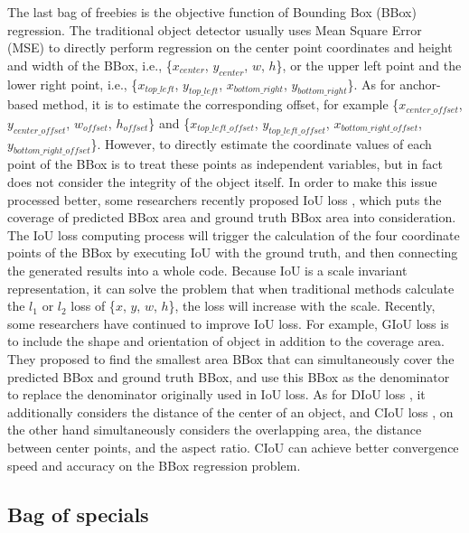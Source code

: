 \documentclass[10pt,twocolumn,letterpaper]{article}
\begin{document}
The last bag of freebies is the objective function of Bounding Box (BBox) regression. The traditional object detector usually uses Mean Square Error (MSE) to directly perform regression on the center point coordinates and height and width of the BBox, i.e., \{$x_{center}$, $y_{center}$, $w$, $h$\}, or the upper left point and the lower right point, i.e., \{$x_{top\_left}$, $y_{top\_left}$, $x_{bottom\_right}$, $y_{bottom\_right}$\}. As for anchor-based method, it is to estimate the corresponding offset, for example \{$x_{center\_offset}$, $y_{center\_offset}$, $w_{offset}$, $h_{offset}$\} and  \{$x_{top\_left\_offset}$, $y_{top\_left\_offset}$, $x_{bottom\_right\_offset}$, $y_{bottom\_right\_offset}$\}. However, to directly estimate the coordinate values of each point of the BBox is to treat these points as independent variables, but in fact does not consider the integrity of the object itself. In order to make this issue processed better, some researchers recently proposed IoU loss \cite{yu2016unitbox}, which puts the coverage of predicted BBox area and ground truth BBox area into consideration. The IoU loss computing process will trigger the calculation of the four coordinate points of the BBox by executing IoU with the ground truth, and then connecting the generated results into a whole code. Because IoU is a scale invariant representation, it can solve the problem that when traditional methods calculate the $l_1$ or $l_2$ loss of \{$x$, $y$, $w$, $h$\}, the loss will increase with the scale. Recently, some researchers have continued to improve IoU loss. For example, GIoU loss \cite{rezatofighi2019generalized} is to include the shape and orientation of object in addition to the coverage area. They proposed to find the smallest area BBox that can simultaneously cover the predicted BBox and ground truth BBox, and use this BBox as the denominator to replace the denominator originally used in IoU loss. As for DIoU loss \cite{zheng2019distance}, it additionally considers the distance of the center of an object, and CIoU loss \cite{zheng2019distance}, on the other hand simultaneously considers the overlapping area, the distance between center points, and the aspect ratio. CIoU can achieve better convergence speed and accuracy on the BBox regression problem.

\newpage

\subsection{Bag of specials}
\end{document}
